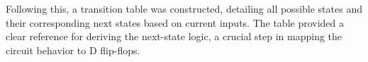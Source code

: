 \documentclass[12pt]{article}
\begin{document}
Following this, a transition table was constructed, detailing all possible states and their corresponding next states based on current inputs. The table provided a clear reference for deriving the next-state logic, a crucial step in mapping the circuit behavior to D flip-flops.
\begin{figure}[H]
	\centering
\end{figure}
\end{document}
